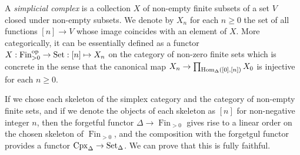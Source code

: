 \documentclass{../../../small}
\begin{document}
\begin{prb}
A \emph{simplicial complex} is a collection $X$ of non-empty finite subsets of a set $V$ closed under non-empty subsets.
We denote by $X_n$ for each $n\ge0$ the set of all functions $[n]\to V$ whose image coincides with an element of $X$.
More categorically, it can be essentially defined as a functor $X:\operatorname{Fin}_{>0}^{\mathrm{op}}\to\operatorname{Set}:[n]\mapsto X_n$ on the category of non-zero finite sets which is concrete in the sense that the canonical map $X_n\to\prod_{\operatorname{Hom}_\Delta([0],[n])}X_0$ is injective for each $n\ge0$.

If we chose each skeleton of the simplex category and the category of non-empty finite sets, and if we denote the objects of each skeleton as $[n]$ for non-negative integer $n$, then the forgetful functor $\Delta\to\operatorname{Fin}_{>0}$ gives rise to a linear order on the chosen skeleton of $\operatorname{Fin}_{>0}$, and the composition with the forgetgul functor provides a functor $\operatorname{Cpx}_\Delta\to\operatorname{Set}_\Delta$.
We can prove that this is fully faithful.

\end{prb}
\end{document}
